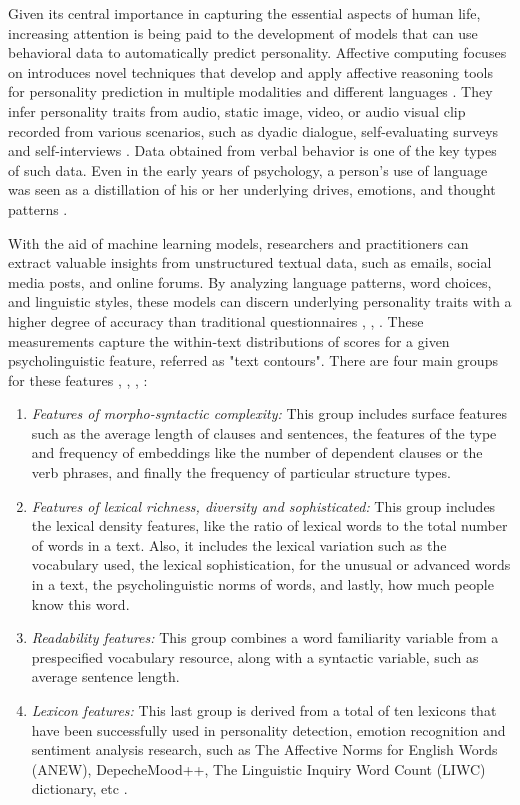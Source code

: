 Given its central importance in capturing the essential aspects of human life, increasing attention is being paid to the development of models that can use behavioral data to automatically predict personality. Affective computing focuses on introduces novel techniques that develop and apply affective reasoning tools for personality prediction in multiple modalities and different languages \cite{el2022deep}. They infer personality traits from audio, static image, video, or audio visual clip recorded from various scenarios, such as dyadic dialogue, self-evaluating surveys and self-interviews \cite{liao2024open}. Data obtained from verbal behavior is one of the key types of such data. Even in the early years of psychology, a person's use of language was seen as a distillation of his or her underlying drives, emotions, and thought patterns \cite{kerz2022pushing}. 

With the aid of machine learning models, researchers and practitioners can extract valuable insights from unstructured textual data, such as emails, social media posts, and online forums. By analyzing language patterns, word choices, and linguistic styles, these models can discern underlying personality traits with a higher degree of accuracy than traditional questionnaires \cite{kerz2022pushing}, \cite{volkova2015inferring}, \cite{akrami2019automatic}. These measurements capture the within-text distributions of scores for a given psycholinguistic feature, referred as "text contours". There are four main groups for these features \cite{kerz2022pushing}, \cite{tandera2017personality}, \cite{vinciarelli2014survey}, \cite{el2022deep}:
\begin{enumerate}
\item \textit{Features of morpho-syntactic complexity:}
This group includes surface features such as the average length of clauses and sentences, the features of the type and frequency of embeddings like the number of dependent clauses or the verb phrases, and finally the frequency of particular structure types.

\item \textit{Features of lexical richness, diversity and sophisticated:}
This group includes the lexical density features, like the ratio of lexical words to the total number of words in a text. Also, it includes the lexical variation such as the vocabulary used, the lexical sophistication, for the unusual or advanced words in a text, the psycholinguistic norms of words, and lastly, how much people know this word.

\item \textit{Readability features:}
This group combines a word familiarity variable from a prespecified vocabulary resource, along with a syntactic variable, such as average sentence length.

\item \textit{Lexicon features:}
This last group is derived from a total of ten lexicons that have been successfully used in personality detection, emotion recognition and sentiment analysis research, such as The Affective Norms for English Words (ANEW), DepecheMood++, The Linguistic Inquiry Word Count (LIWC) dictionary, etc \cite{pennebaker1999linguistic}. 
\end{enumerate}

